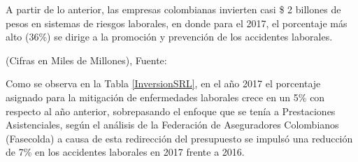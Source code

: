 A partir de lo anterior, las empresas colombianas invierten casi \$ 2 billones de pesos en sistemas de riesgos laborales, en donde para el 2017, el porcentaje más alto (36\%) se dirige a la promoción y prevención de los accidentes laborales. 
\begin{table}[H]
\centering
\footnotesize{(Cifras en Miles de Millones), Fuente: \cite{RevistaDinero2018ReduciendoColombianas}}
\caption{Inversión en Sistemas de Riesgos Laborales (2016 vs 2017)}
\label{InversionSRL}
\end{table}

Como se observa en la Tabla \ref{InversionSRL}, en el año 2017 el porcentaje asignado para la mitigación de enfermedades laborales crece en un 5\% con respecto al año anterior, sobrepasando el enfoque que se tenía a Prestaciones Asistenciales, según el análisis de la Federación de Aseguradores Colombianos (Fasecolda) a causa de esta redirección del presupuesto se impulsó una reducción de 7\% en los accidentes laborales en 2017 frente a 2016.\parencite{RevistaDinero2018ReduciendoColombianas} 

